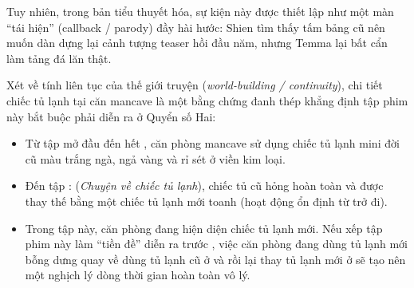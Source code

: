 \documentclass[../main.tex]{subfiles}
\begin{document}
Tuy nhiên, trong bản tiểu thuyết hóa, sự kiện này được thiết lập như một màn ``tái hiện'' (callback / parody) đầy hài hước: Shien tìm thấy tấm bảng cũ nên muốn dàn dựng lại cảnh tượng teaser hồi đầu năm, nhưng Temma lại bất cẩn làm tảng đá lăn thật.

Xét về tính liên tục của thế giới truyện (\textit{world-building / continuity}), chi tiết chiếc tủ lạnh tại căn mancave là một bằng chứng đanh thép khẳng định tập phim này bắt buộc phải diễn ra ở Quyển số Hai:

\begin{itemize}
    \item Từ tập mở đầu {} đến hết {}, căn phòng mancave sử dụng chiếc tủ lạnh mini đời cũ màu trắng ngà, ngả vàng và rỉ sét ở viền kim loại.
    \item Đến tập {}: (\textit{Chuyện về chiếc tủ lạnh}), chiếc tủ cũ hỏng hoàn toàn và được thay thế bằng một chiếc tủ lạnh mới toanh (hoạt động ổn định từ {} trở đi).
    \item Trong tập {} này, căn phòng đang hiện diện chiếc tủ lạnh mới. Nếu xếp tập phim này làm ``tiền đề'' diễn ra trước {}, việc căn phòng đang dùng tủ lạnh mới bỗng dưng quay về dùng tủ lạnh cũ ở {} và {} rồi lại thay tủ lạnh mới ở {} sẽ tạo nên một nghịch lý dòng thời gian hoàn toàn vô lý.
\end{itemize}
\end{document}
